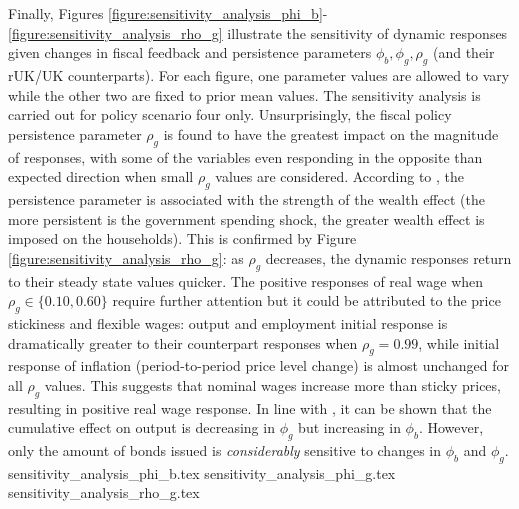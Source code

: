 Finally, Figures \ref{figure:sensitivity_analysis_phi_b}-\ref{figure:sensitivity_analysis_rho_g} illustrate the sensitivity of dynamic responses given changes in fiscal feedback and persistence parameters $\phi_b, \phi_g, \rho_g$ (and their rUK/UK counterparts). For each figure, one parameter values are allowed to vary while the other two are fixed to prior mean values. The sensitivity analysis is carried out for policy scenario four only. Unsurprisingly, the fiscal policy persistence parameter $\rho_g$ is found to have the greatest impact on the magnitude of responses, with some of the variables even responding in the opposite than expected direction when small $\rho_g$ values are considered. According to \textcite[27]{jordigal_2005_understanding}, the persistence parameter is associated with the strength of the wealth effect (the more persistent is the government spending shock, the greater wealth effect is imposed on the households). This is confirmed by Figure \ref{figure:sensitivity_analysis_rho_g}: as $\rho_g$ decreases, the dynamic responses return to their steady state values quicker. The positive responses of real wage when $\rho_g \in \{ 0.10, 0.60 \}$ require further attention but it could be attributed to the price stickiness and flexible wages: output and employment initial response is dramatically greater to their counterpart responses when $\rho_g = 0.99$, while initial response of inflation (period-to-period price level change) is almost unchanged for all $\rho_g$ values. This suggests that nominal wages increase more than sticky prices, resulting in positive real wage response. In line with \citereset\textcite[52]{jordigal_2005_understanding}, it can be shown that the cumulative effect on output is decreasing in $\phi_g$ but increasing in $\phi_b$. However, only the amount of bonds issued is \textit{considerably} sensitive to changes in $\phi_b$ and $\phi_g$.
\newpage
{sensitivity_analysis_phi_b.tex}
\newpage
{sensitivity_analysis_phi_g.tex}
\newpage
{sensitivity_analysis_rho_g.tex}

    